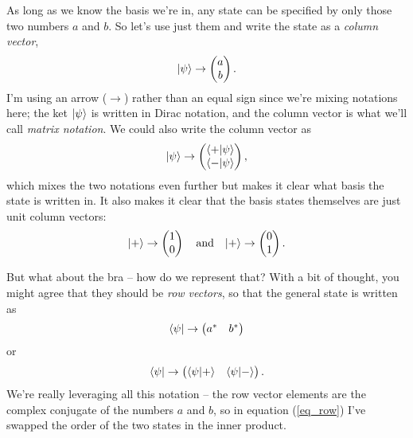 As long as we know the basis we're in, any state can be specified by only those two numbers $a$ and $b$.  So let's use just them and write the state as a \emph{column vector},
\begin{equation}
| \psi \rangle \to \begin{pmatrix} a \\ b \end{pmatrix}.
\end{equation}
I'm using an arrow ($\to$) rather than an equal sign since we're mixing notations here; the ket $| \psi \rangle$ is written in Dirac notation, and the column vector is what we'll call \emph{matrix notation}.  We could also write the column vector as
\begin{equation}
| \psi \rangle \to \begin{pmatrix} \langle + | \psi \rangle \\ \langle - | \psi \rangle \end{pmatrix},
\end{equation}
which mixes the two notations even further but makes it clear what basis the state is written in.  It also makes it clear that the basis states themselves are just unit column vectors:
\begin{equation}
| + \rangle \to \begin{pmatrix} 1 \\ 0 \end{pmatrix} \quad \text{and} \quad | + \rangle \to \begin{pmatrix} 0 \\ 1 \end{pmatrix}.
\end{equation}

But what about the bra -- how do we represent that?  With a bit of thought, you might agree that they should be \emph{row vectors}, so that the general state is written as
\begin{equation}
\langle \psi | \to \begin{pmatrix} a^* & b^* \end{pmatrix}
\end{equation}
or 
\begin{equation}
\label{eq_row}
\langle \psi | \to \begin{pmatrix} \langle \psi | + \rangle & \langle \psi | - \rangle \end{pmatrix}.
\end{equation}
We're really leveraging all this notation -- the row vector elements are the complex conjugate of the numbers $a$ and $b$, so in equation (\ref{eq_row}) I've swapped the order of the two states in the inner product.


